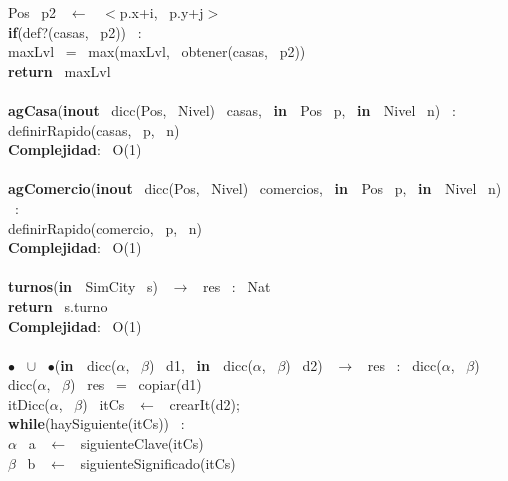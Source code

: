 \begin{Algoritmos}
\indent \indent \indent \indent Pos \ p2 \ $\leftarrow$ \ $<$p.x+i, \ p.y+j$>$ \ \\
\indent \indent \indent \indent \textbf{if}(def?(casas, \ p2)) \ :\\
\indent \indent \indent \indent \indent maxLvl \ = \ max(maxLvl, \ obtener(casas, \ p2))\\
\indent \textbf{return} \ maxLvl\\
\noindent\makebox[\linewidth]{\rule{\textwidth}{0.4pt}}
\\
\noindent\makebox[\linewidth]{\rule{\textwidth}{0.4pt}}
\textbf{agCasa}(\textbf{inout} \ dicc(Pos, \ Nivel) \ casas, \ \textbf{in \ }Pos \ p, \ \textbf{in \ }Nivel \ n) \ :\\
\indent definirRapido(casas, \ p, \ n)\\
\textbf{Complejidad}: \ O(1)\\
\noindent\makebox[\linewidth]{\rule{\textwidth}{0.4pt}}
\\
\noindent\makebox[\linewidth]{\rule{\textwidth}{0.4pt}}
\textbf{agComercio}(\textbf{inout} \ dicc(Pos, \ Nivel) \ comercios, \ \textbf{in \ }Pos \ p, \ \textbf{in \ }Nivel \ n) \ :\\
\indent definirRapido(comercio, \ p, \ n)\\
\textbf{Complejidad}: \ O(1)\\
\noindent\makebox[\linewidth]{\rule{\textwidth}{0.4pt}}
\\
\noindent\makebox[\linewidth]{\rule{\textwidth}{0.4pt}}
\textbf{turnos}(\textbf{in \ }SimCity \ s) \ $\rightarrow $ \ res \ : \ Nat\\
\indent \textbf{return} \ s.turno\\
\textbf{Complejidad}: \ O(1)\\
\noindent\makebox[\linewidth]{\rule{\textwidth}{0.4pt}}
\\
\noindent\makebox[\linewidth]{\rule{\textwidth}{0.4pt}}
$\bullet$ \ $\cup$ \ $\bullet$(\textbf{in \ }dicc($\alpha$, \ $\beta$) \ d1, \ \textbf{in \ }dicc($\alpha$, \ $\beta$) \ d2) \ $\rightarrow $ \ res \ : \ dicc($\alpha$, \ $\beta$)\\
\indent dicc($\alpha$, \ $\beta$) \ res \ = \ copiar(d1)\\
\indent itDicc($\alpha$, \ $\beta$) \ itCs \ $\leftarrow$ \ crearIt(d2);\\
\indent \textbf{while}(haySiguiente(itCs)) \ :\\
\indent \indent $\alpha$ \ a \ $\leftarrow$ \ siguienteClave(itCs)\\
\indent \indent $\beta$ \ b \ $\leftarrow$ \ siguienteSignificado(itCs)\\

\end{Algoritmos}
